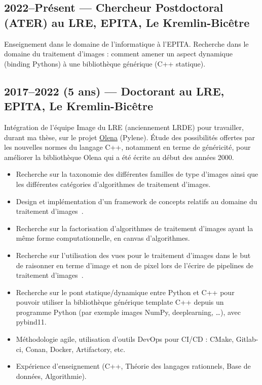 \documentclass[11pt,a4paper,sans]{article} %
\begin{document}
\subsection{2022--Présent --- Chercheur Postdoctoral (ATER) au LRE, EPITA, Le Kremlin-Bicêtre}

Enseignement dans le domaine de l'informatique à l'EPITA.
Recherche dans le domaine du traitement d'images : comment amener un aspect dynamique (binding Pythons) à une
bibliothèque générique (C++ statique).

\subsection{2017--2022 (5 ans) --- Doctorant au LRE, EPITA, Le Kremlin-Bicêtre}

Intégration de l'équipe Image du LRE (anciennement LRDE) pour travailler, durant ma thèse, sur le projet
\href{https://www.lre.epita.fr/wiki/Olena}{Olena} (Pylene). \'Etude des possibilités offertes par les nouvelles normes
du langage C++, notamment en terme de généricité, pour améliorer la bibliothèque Olena qui a été écrite au début des
années 2000.
\begin{itemize}
  \item Recherche sur la taxonomie des différentes familles de type d'images ainsi que les différentes catégories
        d'algorithmes de traitement d'images.
  \item Design et implémentation d'un framework de concepts relatifs au domaine du traitement
        d'images~\parencite{roynard.2019.rrpr}.
  \item Recherche sur la factorisation d'algorithmes de traitement d'images ayant la même forme computationnelle, en
        canvas d'algorithmes.
  \item Recherche sur l'utilisation des vues pour le traitement d'images dans le but de raisonner en terme d'image et
        non de pixel lors de l'écrire de pipelines de traitement d'images~\parencite{roynard.2022.gpce}.
  \item Recherche sur le pont statique/dynamique entre Python et C++ pour pouvoir utiliser la bibliothèque générique
        template C++ depuis un programme Python (par exemple images NumPy, deeplearning, \ldots), avec pybind11.
  \item Méthodologie agile, utilisation d'outils DevOps pour CI/CD : CMake, Gitlab-ci, Conan, Docker, Artifactory, etc.
  \item Expérience d'enseignement (C++, Théorie des langages rationnels, Base de données, Algorithmie).
\end{itemize}
\end{document}
